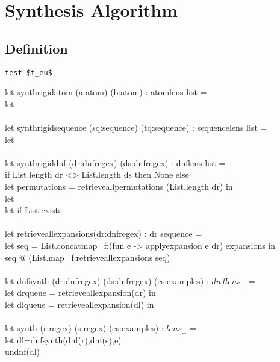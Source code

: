 \section{Synthesis Algorithm}

\subsection{Definition}

\begin{lstlisting}[mathescape]
test $t_eu$
\end{lstlisting}

let synthrigidatom (a:atom) (b:atom) : atomlens list =\\
\hspace*{.5em}let\\
\\
let synthrigidsequence (sq:sequence) (tq:sequence) : sequencelens list =\\
\hspace*{.5em}let\\
\\
let synthrigiddnf (dr:dnfregex) (ds:dnfregex) : dnflens list =\\
\hspace*{.5em}if List.length dr <> List.length ds then None else\\
\hspace*{.5em}let permutations = retrieveallpermutations (List.length dr) in\\
\hspace*{.5em}let \\
\hspace*{.5em}let if List.exists\\
\\
let retrieveallexpansions(dr:dnfregex) : dr sequence =\\
\hspace*{.5em}let seq = List.concatmap ~f:(fun e -> applyexpansion e dr) expansions in\\
\hspace*{.5em}seq @ (List.map ~f:retrieveallexpansions seq)\\
\\
let dnfsynth (dr:dnfregex) (ds:dnfregex) (es:examples) : $dnflens_{\bot}$ =\\
\hspace*{.5em}let drqueue = retrieveallexpansion(dr) in\\
\hspace*{.5em}let dlqueue = retrieveallexpansion(dl) in\\
\\
let synth (r:regex) (s:regex) (es:examples) : $lens_{\bot}$ =\\
\hspace*{.5em}let dl=dnfsynth(dnf(r),dnf(s),e)\\
\hspace*{.5em}undnf(dl)\\


